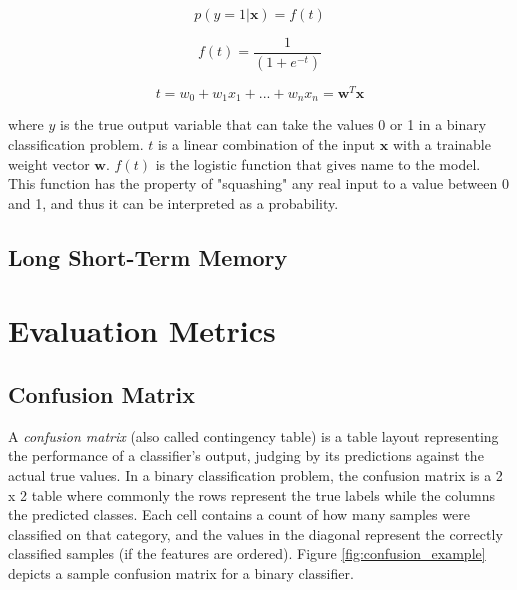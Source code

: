 \documentclass{kththesis}
\begin{document}
\begin{equation}
p(y = 1|\bm{x}) = f(t)
\end{equation}

\begin{equation}
f(t) = \frac{1}{(1+e^{-t})}
\end{equation}

\begin{equation}
t = w_0 + w_1x_1 + ... + w_nx_n = \bm{w}^T\bm{x}
\end{equation}

where $y$ is the true output variable that can take the values 0 or 1 in a binary classification problem. $t$ is a linear combination of the input $\bm{x}$ with a trainable weight vector $\bm{w}$. $f(t)$ is the logistic function that gives name to the model. This function has the property of "squashing" any real input to a value between 0 and 1, and thus it can be interpreted as a probability.


\subsection{Long Short-Term Memory}


\section{Evaluation Metrics}

\subsection{Confusion Matrix}

A \emph{confusion matrix} (also called contingency table) is a table layout representing the performance of a classifier's output, judging by its predictions against the actual true values. In a binary classification problem, the confusion matrix is a 2 x 2 table where commonly the rows represent the true labels while the columns the predicted classes. Each cell contains a count of how many samples were classified on that category, and the values in the diagonal represent the correctly classified samples (if the features are ordered). Figure \ref{fig:confusion_example} depicts a sample confusion matrix for a binary classifier.
\end{document}
